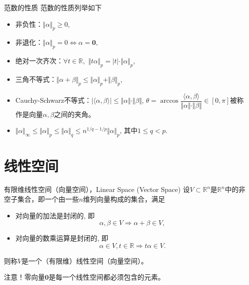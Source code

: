 \documentclass[10pt]{beamer}
\begin{document}
\begin{frame}

\begin{block}{范数的性质}
范数的性质列举如下
\begin{itemize}
\item 非负性：$\Vert \alpha \Vert_p \geqslant 0$,
\item 非退化：$\Vert \alpha \Vert_p = 0 \Longleftrightarrow \alpha = \mathbf{0},$
\item 绝对一次齐次：$\forall t\in\mathbb{R},$ $\Vert t\alpha \Vert_p = |t|\cdot\Vert \alpha \Vert_p$,
\item 三角不等式：$\Vert \alpha + \beta \Vert_p \leqslant \Vert \alpha \Vert_p + \Vert \beta \Vert_p$,
\item Cauchy-Schwarz不等式：$|\langle \alpha, \beta \rangle| \leqslant \Vert \alpha \Vert \cdot \Vert \beta \Vert$,\newline
$\theta = \arccos \dfrac{\langle \alpha, \beta \rangle}{\Vert \alpha \Vert \cdot \Vert \beta \Vert} \in [0, \pi]$被称作是向量$\alpha, \beta$之间的夹角。
\end{itemize}
\end{block}

\vspace{1em}
\pause

\begin{itemize}
\color{zkblue!50}
\item $\Vert \alpha \Vert_{\infty} \leqslant \Vert \alpha \Vert_p \leqslant \Vert \alpha \Vert_q \leqslant n^{1/q - 1/p}\Vert \alpha \Vert_p$, 其中$1\leqslant q < p$.
\end{itemize}

\end{frame}


\section{线性空间}


\begin{frame}

\begin{block}{有限维线性空间（向量空间），Linear Space (Vector Space)}
设$V \subset \mathbb{R}^n$是$\mathbb{R}^n$中的非空子集合，即一个由一些$n$维列向量构成的集合，满足
\begin{itemize}
\item 对向量的加法是封闭的, 即
$$\alpha, \beta \in V \Longrightarrow \alpha + \beta \in V,$$
\item 对向量的数乘运算是封闭的, 即
$$\alpha \in V, t \in \mathbb{R} \Longrightarrow t\alpha \in V.$$
\end{itemize}
则称$V$是一个（有限维）线性空间（向量空间）。
\end{block}

{\color{red}注意！}零向量$\mathbf{0}$是每一个线性空间都必须包含的元素。

\end{frame}
\end{document}
